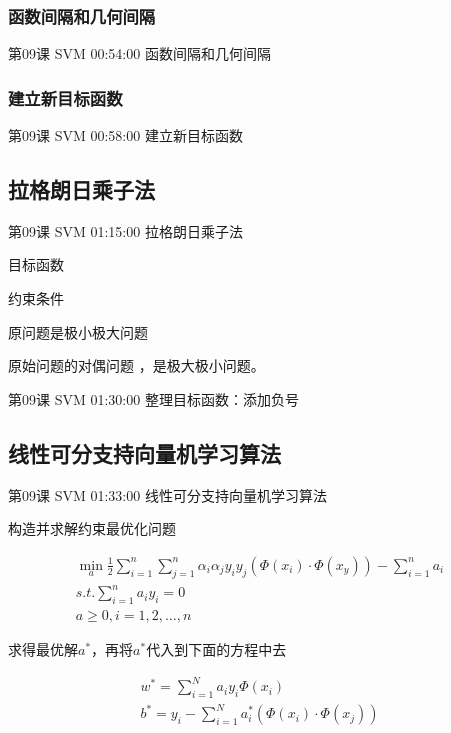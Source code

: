 \documentclass[UTF8]{ctexbook}
\begin{document}
\subsubsection{函数间隔和几何间隔}

第09课 SVM 00:54:00 函数间隔和几何间隔

\subsubsection{建立新目标函数}

第09课 SVM 00:58:00 建立新目标函数

\subsection{拉格朗日乘子法}

第09课 SVM 01:15:00 拉格朗日乘子法

目标函数

约束条件

原问题是极小极大问题

原始问题的对偶问题 ，是极大极小问题。

第09课 SVM 01:30:00 整理目标函数：添加负号

\subsection{线性可分支持向量机学习算法}

第09课 SVM 01:33:00 线性可分支持向量机学习算法

构造并求解约束最优化问题

\begin{equation}
\begin{aligned}
\underset{a}{\min} \frac{1}{2} \sum_{i=1}^{n} \sum_{j=1}^{n} \alpha_{i} \alpha_{j} y_{i} y_{j} \left ( \Phi(x_{i}) \cdot  \Phi(x_{y}) \right ) - \sum_{i=1}^{n} a_{i} \\
s.t. \sum_{i=1}^{n} a_{i}y_{i}=0 \\
a \geq 0, i=1,2,\dots , n
\end{aligned}
\end{equation}

求得最优解$a^{*}$，再将$a^{*}$代入到下面的方程中去

\begin{equation}
\begin{aligned}
w^{*}=\sum_{i=1}^{N}a_{i}y_{i}\Phi (x_{i}) \\
b^{*}=y_{i}-\sum_{i=1}^{N}a_{i}^{*} \left ( \Phi(x_{i}) \cdot \Phi(x_{j}) \right )
\end{aligned}
\end{equation}
\end{document}
